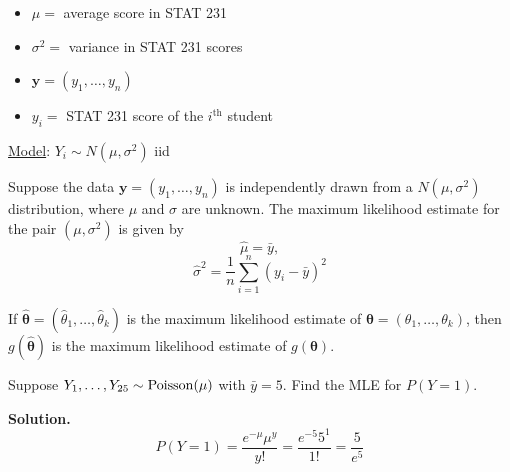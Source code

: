 \begin{exbox}
    \begin{example} $ \; $
        \begin{itemize}
            \item $ \mu = $ average score in STAT 231
            \item $ \sigma^2= $ variance in STAT 231 scores
            \item $ \bm{y}=(y_1,\ldots ,y_n) $
            \item $ y_i= $ STAT 231 score of the $ i^{\text{th}} $ student
        \end{itemize}
        \underline{Model}: $ Y_i \sim N(\mu,\sigma^2) $ iid
    \end{example}
\end{exbox}

\begin{thmbox}
    \begin{prop}
        Suppose the data $ \bm{y}=(y_1,\ldots ,y_n) $ is independently
        drawn from a $ N(\mu,\sigma^2) $ distribution,
        where $ \mu $ and $ \sigma $ are unknown. The maximum
        likelihood estimate for the pair $ (\mu,\sigma^2) $ is given by
        \[ \hat{\mu}=\bar{y}, \]
        \[ \hat{\sigma}^2=\frac{1}{n} \sum\limits_{i=1}^{n} \left( y_i-\bar{y} \right)^2 \]
    \end{prop}
\end{thmbox}

\begin{thmbox}
    \begin{theorem}
        If $ \hat{\bm{\theta}}=(\hat{\theta}_1,\ldots ,\hat{\theta}_k) $ is the maximum likelihood
        estimate of $ \bm{\theta}=(\theta_1,\ldots ,\theta_k) $, then
        $ g(\bm{\hat{\theta}}) $ is the maximum likelihood estimate of $ g(\bm{\theta}) $.
    \end{theorem}
\end{thmbox}

\begin{exbox}
    \begin{example}
        Suppose $ Y_1,\ldots ,Y_{25} \sim \operatorname{Poisson}(\mu) $ with $ \bar{y}=5 $.
        Find the MLE for $ P(Y=1) $.

        \textbf{Solution.}
        \[ P(Y=1)=\frac{e^{-\mu}\mu^y}{y!}=\frac{e^{-5}5^1}{1!}=\frac{5}{e^5} \]
    \end{example}
\end{exbox}
